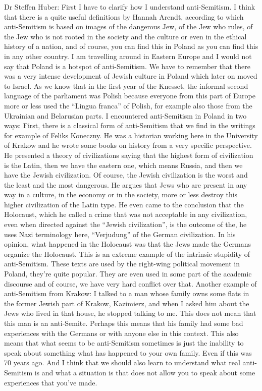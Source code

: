 Dr Steffen Huber: First I have to clarify how I understand anti-Semitism. I think that there is a quite useful definitions by Hannah Arendt, according to which anti-Semitism is based on images of the dangerous Jew, of the Jew who rules, of the Jew who is not rooted in the society and the culture or even in the ethical history of a nation, and of course, you can find this in Poland as you can find this in any other country. I am travelling around in Eastern Europe and I would not say that Poland is a hotspot of anti-Semitism. We have to remember that there was a very intense development of Jewish culture in Poland which later on moved to Israel. As we know that in the first year of the Knesset, the informal second language of the parliament was Polish because everyone from this part of Europe more or less used the “Lingua franca” of Polish, for example also those from the Ukrainian and Belarusian parts. I encountered anti-Semitism in Poland in two ways: First, there is a classical form of anti-Semitism that we find in the writings for example of Feliks Koneczny. He was a historian working here in the University of Krakow and he wrote some books on history from a very specific perspective. He presented a theory of civilizations saying that the highest form of civilization is the Latin, then we have the eastern one, which means Russia, and then we have the Jewish civilization. Of course, the Jewish civilization is the worst and the least and the most dangerous. He argues that Jews who are present in any way in a culture, in the economy or in the society, more or less destroy this higher civilization of the Latin type. He even came to the conclusion that the Holocaust, which he called a crime that was not acceptable in any civilization, even when directed against the “Jewish civilization”, is the outcome of the, he uses Nazi terminology here, “Verjudung” of the German civilization. In his opinion, what happened in the Holocaust was that the Jews made the Germans organize the Holocaust. This is an extreme example of the intrinsic stupidity of anti-Semitism. These texts are used by the right-wing political movement in Poland, they're quite popular. They are even used in some part of the academic discourse and of course, we have very hard conflict over that.  Another example of anti-Semitism from Krakow: I talked to a man whose family owns some flats in the former Jewish part of Krakow, Kazimierz, and when I asked him about the Jews who lived in that house, he stopped talking to me. This does not mean that this man is an anti-Semite. Perhaps this means that his family had some bad experiences with the Germans or with anyone else in this context. This also means that what seems to be anti-Semitism sometimes is just the inability to speak about something what has happened to your own family. Even if this was 70 years ago. And I think that we should also learn to understand what real anti-Semitism is and what a situation is that does not allow you to speak about some experiences that you’ve made. 

